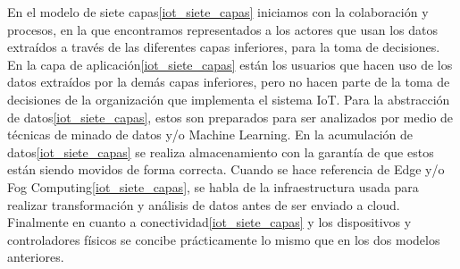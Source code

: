 \documentclass[stu,12pt,floatsintext]{apa7}
\begin{document}
	En el modelo de siete capas\ref{iot_siete_capas} iniciamos con la colaboración y procesos, en la que encontramos representados a los actores que usan los datos extraídos a través de las diferentes capas inferiores, para la toma de decisiones. En la capa de aplicación\ref{iot_siete_capas} están los usuarios que hacen uso de los datos extraídos por la demás capas inferiores, pero no hacen parte de la toma de decisiones de la organización que implementa el sistema IoT. Para la abstracción de datos\ref{iot_siete_capas}, estos son preparados para ser analizados por medio de técnicas de minado de datos y/o Machine Learning. En la acumulación de datos\ref{iot_siete_capas} se realiza almacenamiento con la garantía de que estos están siendo movidos de forma correcta. Cuando se hace referencia de Edge y/o Fog Computing\ref{iot_siete_capas}, se habla de la infraestructura usada para realizar transformación y análisis de datos antes de ser enviado a cloud. Finalmente en cuanto a conectividad\ref{iot_siete_capas} y  los dispositivos y controladores físicos se concibe prácticamente lo mismo que en los dos modelos anteriores.
	
\end{document}
